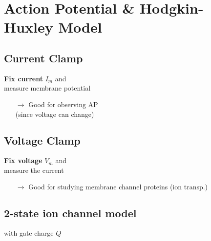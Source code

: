 
\section{Action Potential \& Hodgkin-Huxley Model}
\begin{minipage}[t]{.5\columnwidth-.5\columnsep}
    \subsection{Current Clamp}
    \textbf{Fix current} $I_m$ and\\
    measure membrane potential
    \begin{itemize}
        \item[$\to\!\!$] Good for observing AP\\
        (since voltage can change)
    \end{itemize}
\end{minipage}%
\hspace{\columnsep}%
\begin{minipage}[t]{.5\columnwidth-.5\columnsep}
    \subsection{Voltage Clamp}
    \textbf{Fix voltage} $V_m$ and\\
    measure the current
    \begin{itemize}
        \item[$\to\!\!$] Good for studying membrane channel proteins (ion transp.)
    \end{itemize}
\end{minipage}
\subsection{2-state ion channel model}
%
\quad with gate charge $Q$

